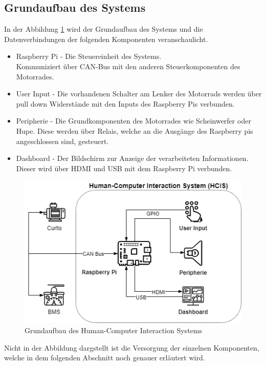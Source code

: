\subsection{Grundaufbau des Systems}
In der Abbildung \ref{fig:aufbauHCIS} wird der Grundaufbau des Systems und die Datenverbindungen der folgenden  Komponenten veranschaulicht.

\begin{itemize}
	\item Raspberry Pi - Die Steuereinheit des Systems.
	\\ Kommuniziert über CAN-Bus mit den anderen Steuerkomponenten des Motorrades.
	\item User Input - Die vorhandenen Schalter am Lenker des Motorrads werden über pull down Widerstände mit den Inputs des Raspberry Pis verbunden. 
	\item Peripherie - Die Grundkomponenten des Motorrades wie Scheinwerfer oder Hupe. Diese werden über Relais, welche an die Ausgänge des Raspberry pis angeschlossen sind, gesteuert.
	\item Dashboard - Der Bildschirm zur Anzeige der verarbeiteten Informationen. Dieser wird über HDMI und USB mit dem Raspberry Pi verbunden.
\end{itemize}

\begin{figure}[H]
	\begin{center}
		\includegraphics[scale=0.6]{figures/hcis/HCIS_Grundfunktion.png}
		\caption{Grundaufbau des Human-Computer Interaction Systems}
		\label{fig:aufbauHCIS}
	\end{center}
\end{figure}

Nicht in der Abbildung dargstellt ist die Versorgung der einzelnen Komponenten, welche in dem folgenden Abschnitt noch genauer erläutert wird.

